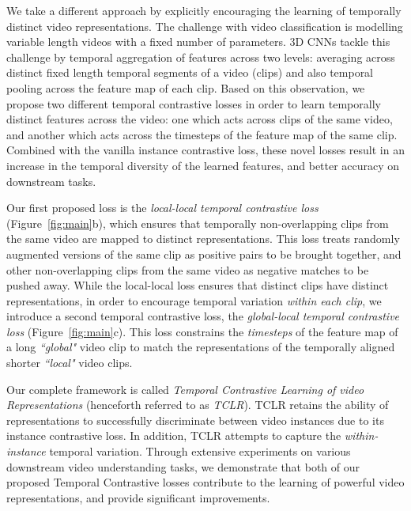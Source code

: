 \documentclass[10pt,twocolumn,letterpaper]{article}
\begin{document}
We take a different approach by explicitly encouraging the learning of temporally distinct video representations. The challenge with video classification is modelling variable length videos with a fixed number of parameters. 3D CNNs tackle this challenge by temporal aggregation of features across two levels: averaging across distinct fixed length temporal segments of a video (clips) and also temporal pooling across the feature map of each clip. Based on this observation, we propose two different temporal contrastive losses in order to learn temporally distinct features across the video: one which acts across clips of the same video, and another which acts across the timesteps of the feature map of the same clip. Combined with the vanilla instance contrastive loss, these novel losses result in an increase in the temporal diversity of the learned features, and better accuracy on downstream tasks. 


Our first proposed loss is the {\em local-local temporal contrastive loss} (Figure~\ref{fig:main}b), which ensures that temporally non-overlapping clips from the same video are mapped to distinct representations. This loss treats randomly augmented versions of the same clip as positive pairs to be brought together, and other non-overlapping clips from the same video as negative matches to be pushed away. While the local-local loss ensures that distinct clips have distinct representations, in order to encourage temporal variation {\em within each clip}, we introduce a second temporal contrastive loss, the {\em global-local temporal contrastive loss} (Figure~\ref{fig:main}c). This loss constrains the \textit{timesteps} of the feature map of a long \textit{``global"} video clip to match the representations of the temporally aligned shorter \textit{``local"} video clips. 




Our complete framework is called \textit{Temporal Contrastive Learning of video Representations} (henceforth referred to as \textit{TCLR}). TCLR retains the ability of representations to successfully discriminate between video instances due to its instance contrastive loss. In addition, TCLR attempts to capture the {\em within-instance} temporal variation. Through extensive experiments on various downstream video understanding tasks, we demonstrate that both of our proposed Temporal Contrastive losses contribute to the learning of powerful video representations, and provide significant improvements.
\end{document}
